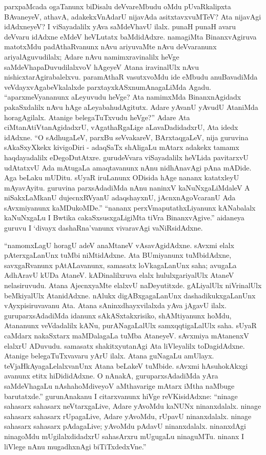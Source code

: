 parxpaMcada ogaTanunx biDisalu deVvareMbudu oMdu pUvaRkalipxta BAvaneyeV, athavA, adakekxVnAdarU nijavAda asitxtavxvuMTeV? Ata nijavAgi idAdxneyeV? I viSayadalilx yAva saMdeVhavU ilalx. punaH punaH avaru deVvaru idAdxne eMdeV heVLutatx baMdidAdxre. namagiMta BinanxvAgiruva matotxMdu padAthaRvanunx nAvu ariyuvaMte nAvu deVvaranunx ariyalAguvudilalx; Adare nAvu namimxravinalilx heVge saMdeVhapaDuvudilalxvoV hAgeyeV Atana iravinalUlx nAvu nishicxtarAgirabalelxvu. paramAthaR vasutxvoMdu ide eMbudu anuBavadiMda veVdayxvAgabeVkalalxde parxtayxkASxnumAnagaLiMda Agadu. ``aparxmeVyananunx aLeyuvudu heVge? Ata namimxMda BinanxnAgidadx pakaSxdalilx nAvu hAge aLeyabahudAgitutx. Adare yAvanU yAvudU AtaniMda horagAgilalx. Atanige belegaTuTxvudu heVge?'' Adare Ata ciMtanAtiVtanAgidadxrU, vAgathaRgaLige aLavaDadidadxrU, Ata idedx idAdxne. ``O sAdhugaLeV, parxBu seVvakareV, BArxtaqgaLeV, nija guruvina sAkaSxyXkekx kivigoDiri - adaqSaTx shAligaLu mAtarx adakekx tamamx haqdayadalilx eDegoDutAtxre. gurudeVvara viSayadalilx heVLida pavitarxvU udAtatxvU Ada mAtugaLa amaqtavanunx nAnu nidhAnavAgi pAna mADide. Aga beLaku mUDitu. sUyaR iruLanunx ODisida hAge nananx katatxleyU mAyavAyitu. guruvina parxsAdadiMda nAnu naninxV kaNuNxgaLiMdaleV A niSakxLaMkanU dujecnxRVyanU adaqshayxnU, jAcnxnAgoVcaranU Ada sAvxmiyanunx kaMDukoMDe.'' ``nananx perxVmaputathxLiyanunx kANabalalx kaNuNxgaLu I Bwtika cakaSxsusxgaLigiMta tiVra BinanxvAgive.'' aidaneya guruvu I `divayx dashaRna'vanunx vivaravAgi vaNiRsidAdxne.

``namomxLagU horagU adeV anaMtaneV vAsavAgidAdxne. sAvxmi elalx pAterxgaLanUnx tuMbi niMtidAdxne. Ata BUmiyanunx tuMbidAdxne, savxgaRvanunx pAtALavanunx, samasatx loVkagaLanUnx saha; avugaLa AdhAravU kUDa AtaneV. kADinalilxruva elalx hululxgariyalUlx AtaneV nelasiruvudu. Atana AjecnxyaMte elalxvU naDeyutitxde. gALiyalUlx niVrinalUlx beMkiyalUlx AtanidAdxne. nAlukx digABxgagaLanUnx dashadikukxgaLanUnx vAyxpisiruvavanu Ata. Atana sAninxdhayxvilalxda yAva jAgavU ilalx. guruparxsAdadiMda idanunx sAkASxtakxrisiko, shAMtiyanunx hoMdu, Atananunx veVdadalilx kANu, purANagaLalUlx samxqqtigaLalUlx saha. sUyaR caMdarx nakaSxtarx maMDalagaLa tuMba AtaneyeV. sAvxmiya mAtanenxV elalxrU ADuvudu. samasatx shakitxyutanAgi Ata liVleyalilx toDagidAdxne. Atanige belegaTuTxvavaru yArU ilalx. Atana guNagaLu amUlayx. teVjaHkAyagaLelalxvanUnx Atana beLakeV tuMbide. sAvxmi hAsuhokAkxgi avanunx etitx hiDididAdxne. O nAnakA, guruparxsAdadiMda yAra saMdeVhagaLu nAshahoMdiveyoV aMthavarige mAtarx iMtha naMbuge barutatxde.'' gurunAnakanu I citarxvanunx hiVge reVKisidAdxne: ``ninage sahasarx sahasarx neVtarxgaLive, Adare yAvoMdu kaNUNx ninanxdalalx. ninage sahasarx sahasarx rUpagaLive, Adare yAvoMdu, rUpavU ninanxdalalx. ninage sahasarx sahasarx pAdagaLive; yAvoMdu pAdavU ninanxdalalx. ninanxdAgi ninagoMdu mUgilalxdidadxrU sahasArxru mUgugaLu ninaguMTu. ninanx I liVlege nAnu mugadhxnAgi biTiTxdedxVne.''

